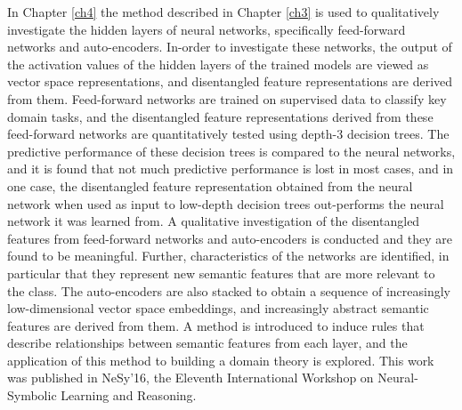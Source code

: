 In Chapter \ref{ch4} the method described in Chapter \ref{ch3} is used to qualitatively investigate the hidden layers of neural networks, specifically feed-forward networks and auto-encoders.  In-order to investigate these networks, the output of the activation values of the hidden layers  of the trained models are viewed as vector space representations,  and  disentangled feature representations are derived from them. Feed-forward networks are trained on supervised data to classify key domain tasks, and the disentangled feature representations derived from these feed-forward networks are quantitatively tested using depth-3 decision trees. The predictive performance of these decision trees is compared to the neural networks, and it is found that not much predictive performance is lost in most cases, and in one case, the disentangled feature representation obtained from the neural network when used as input to low-depth decision trees  out-performs the neural network it was learned from. A qualitative investigation of the disentangled features from feed-forward networks and auto-encoders is conducted and they are found to be meaningful. Further, characteristics of the networks are identified, in particular that they represent new semantic features that are more relevant to the class. The auto-encoders are also stacked to obtain a sequence of increasingly low-dimensional vector space embeddings, and increasingly abstract semantic features are derived from them. A method is introduced to induce rules that describe relationships between semantic features from each layer, and the application of this method to  building a domain theory is explored. This work was published in NeSy'16, the Eleventh International Workshop on Neural-Symbolic Learning and Reasoning.

